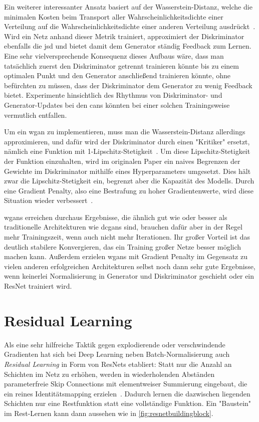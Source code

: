 Ein weiterer interessanter Ansatz basiert auf der Wasserstein-Distanz, welche die minimalen Kosten beim Transport aller Wahrscheinlichkeitsdichte einer Verteilung auf die Wahrscheinlichkeitsdichte einer anderen Verteilung ausdrückt~\cite{Arjovsky.2017}.
Wird ein Netz anhand dieser Metrik trainiert, approximiert der Diskriminator ebenfalls die \gls{jsd} und bietet damit dem Generator ständig Feedback zum Lernen.
Eine sehr vielversprechende Konsequenz dieses Aufbaus wäre, dass man tatsächlich zuerst den Diskriminator getrennt trainieren könnte bis zu einem optimalen Punkt und den Generator anschließend trainieren könnte, ohne befürchten zu müssen, dass der Diskriminator dem Generator zu wenig Feedback bietet.
Experimente hinsichtlich des Rhythmus von Diskriminator- und Generator-Updates bei den \glspl{can} könnten bei einer solchen Trainingsweise vermutlich entfallen.

Um ein \gls{wgan} zu implementieren, muss man die Wasserstein-Distanz allerdings approximieren, und dafür wird der Diskriminator durch einen "Kritiker" ersetzt, nämlich eine Funktion mit 1-Lipschitz-Stetigkeit~\cite{Arjovsky.2017b}.
Um diese Lipschitz-Stetigkeit der Funktion einzuhalten, wird im originalen Paper ein naives Begrenzen der Gewichte im Diskriminator mithilfe eines Hyperparameters umgesetzt.
Dies hält zwar die Lipschitz-Stetigkeit ein, begrenzt aber die Kapazität des Modells.
Durch eine Gradient Penalty, also eine Bestrafung zu hoher Gradientenwerte, wird diese Situation wieder verbessert~\cite{Gulrajani.2017}.

\glspl{wgan} erreichen durchaus Ergebnisse, die ähnlich gut wie oder besser als traditionelle Architekturen wie \glspl{dcgan} sind, brauchen dafür aber in der Regel mehr Trainingszeit, wenn auch nicht mehr Iterationen.
Ihr großer Vorteil ist das deutlich stabilere Konvergieren, das ein Training großer Netze besser möglich machen kann.
Außerdem erzielen \glspl{wgan} mit Gradient Penalty im Gegensatz zu vielen anderen erfolgreichen Architekturen selbst noch dann sehr gute Ergebnisse, wenn keinerlei Normalisierung in Generator und Diskriminator geschieht oder ein ResNet trainiert wird.



\section{Residual Learning}

Als eine sehr hilfreiche Taktik gegen explodierende oder verschwindende Gradienten hat sich bei Deep Learning neben Batch-Normalisierung auch \emph{Residual Learning} in Form von ResNets etabliert:
Statt nur die Anzahl an Schichten im Netz zu erhöhen, werden in wiederholenden Abständen parameterfreie Skip Connections mit elementweiser Summierung eingebaut, die ein reines Identitätsmapping erzielen~\cite{He.2016}.
Dadurch lernen die dazwischen liegenden Schichten nur eine Restfunktion statt eine vollständige Funktion.
Ein "Baustein" im Rest-Lernen kann dann aussehen wie in \autoref{fig:resnetbuildingblock}.

